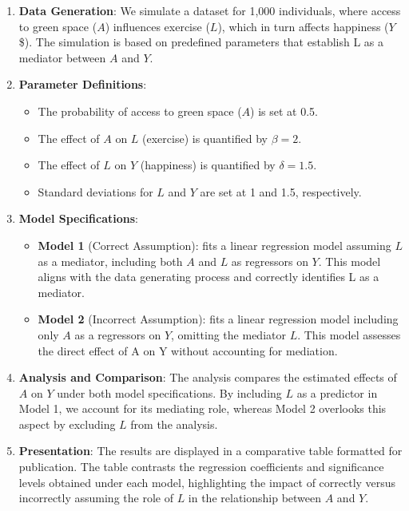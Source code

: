 \documentclass[
  singlecolumn]{article}
\providecommand{\tightlist}{%
  \setlength{\itemsep}{0pt}\setlength{\parskip}{0pt}}\usepackage{longtable,booktabs,array}
\begin{document}
\begin{enumerate}
\def\labelenumi{\arabic{enumi}.}
\item
  \textbf{Data Generation}: We simulate a dataset for 1,000 individuals,
  where access to green space (\(A\)) influences exercise (\(L\)), which
  in turn affects happiness (\(Y\)\$). The simulation is based on
  predefined parameters that establish L as a mediator between \(A\) and
  \(Y\).
\item
  \textbf{Parameter Definitions}:

  \begin{itemize}
  \tightlist
  \item
    The probability of access to green space (\(A\)) is set at 0.5.
  \item
    The effect of \(A\) on \(L\) (exercise) is quantified by
    \(\beta = 2\).
  \item
    The effect of \(L\) on \(Y\) (happiness) is quantified by
    \(\delta = 1.5\).
  \item
    Standard deviations for \(L\) and \(Y\) are set at 1 and 1.5,
    respectively.
  \end{itemize}
\item
  \textbf{Model Specifications}:

  \begin{itemize}
  \tightlist
  \item
    \textbf{Model 1} (Correct Assumption): fits a linear regression
    model assuming \(L\) as a mediator, including both \(A\) and \(L\)
    as regressors on \(Y\). This model aligns with the data generating
    process and correctly identifies L as a mediator.
  \item
    \textbf{Model 2} (Incorrect Assumption): fits a linear regression
    model including only \(A\) as a regressors on \(Y\), omitting the
    mediator \(L\). This model assesses the direct effect of A on Y
    without accounting for mediation.
  \end{itemize}
\item
  \textbf{Analysis and Comparison}: The analysis compares the estimated
  effects of \(A\) on \(Y\) under both model specifications. By
  including \(L\) as a predictor in Model 1, we account for its
  mediating role, whereas Model 2 overlooks this aspect by excluding
  \(L\) from the analysis.
\item
  \textbf{Presentation}: The results are displayed in a comparative
  table formatted for publication. The table contrasts the regression
  coefficients and significance levels obtained under each model,
  highlighting the impact of correctly versus incorrectly assuming the
  role of \(L\) in the relationship between \(A\) and \(Y\).
\end{enumerate}
\end{document}
